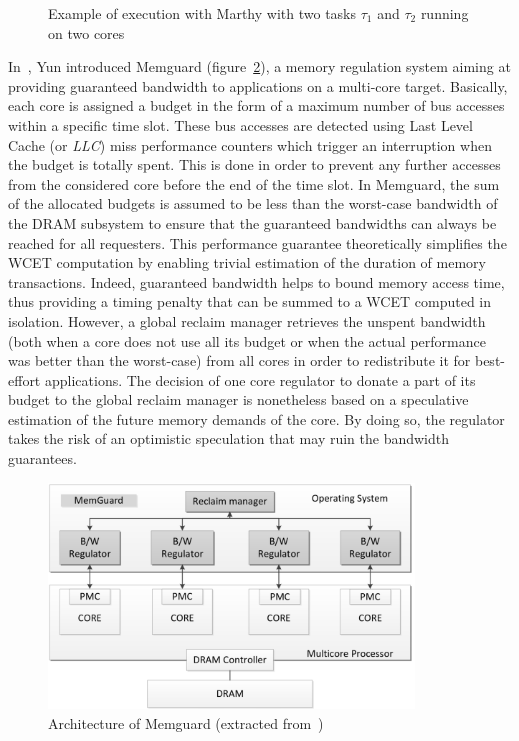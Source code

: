 \documentclass[main.tex]{subfiles}
\begin{document}
\begin{figure}
    \centering
    
    \caption{Example of execution with {\sc Marthy} with two tasks $\tau_1$ and
    $\tau_2$ running on two cores}
    \label{fig_stateOfTheArt_MarthyDiagram}
\end{figure}

In~\cite{Yun2013}, Yun \etal introduced Memguard
(figure~\ref{fig_stateOfTheArt_Memguard}), a memory regulation system aiming at
providing guaranteed bandwidth to applications on a multi-core target.
Basically, each core is assigned a budget in the form of a maximum number of
bus accesses within a specific time slot. These bus accesses are detected using
Last Level Cache (or \emph{LLC}) miss performance counters which trigger an
interruption when the budget is totally spent. This is done in order to prevent
any further accesses from the considered core before the end of the time slot.
In Memguard, the sum of the allocated budgets is assumed to be less than the
worst-case bandwidth of the DRAM subsystem to ensure that the guaranteed
bandwidths can always be reached for all requesters.  This performance
guarantee theoretically simplifies the WCET computation by enabling trivial
estimation of the duration of memory transactions. Indeed, guaranteed bandwidth
helps to bound memory access time, thus providing a timing penalty that can be
summed to a WCET computed in isolation. However, a global reclaim manager
retrieves the unspent bandwidth (both when a core does not use all its budget
or when the actual performance was better than the worst-case) from all cores
in order to redistribute it for best-effort applications. The decision of one
core regulator to donate a part of its budget to the global reclaim manager is
nonetheless based on a speculative estimation of the future memory demands of
the core. By doing so, the regulator takes the risk of an optimistic
speculation that may ruin the bandwidth guarantees. \\

\begin{figure}
    \centering
    \includegraphics[height=6cm]{imgs/png/stateOfTheArt_Memguard.png}
    \caption{Architecture of Memguard (extracted from~\cite{Yun2013})}
    \label{fig_stateOfTheArt_Memguard}
\end{figure}
\end{document}
